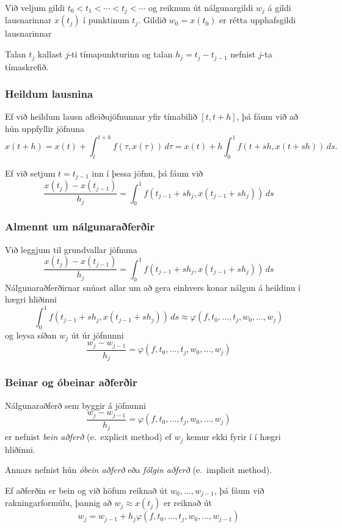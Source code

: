 \documentclass[icelandic,a4paper,12pt]{article}
\begin{document}
\pause
\smallskip
Við veljum gildi $t_0 < t_1 < \cdots < t_j<\cdots$ og reiknum út
nálgunargildi $w_j$ á gildi lausnarinnar $x(t_j)$ í punktinum
$t_j$.   Gildið $w_0=x(t_0)$ er rétta upphafsgildi lausnarinnar 

\smallskip
Talan $t_j$ kallast $j$-ti tímapunkturinn og talan
$h_j=t_j-t_{j-1}$ nefnist $j$-ta tímaskrefið.



\subsubsection{Heildum lausnina}
Ef við heildum lausn afleiðujöfnunnar yfir tímabilið 
$[t,t+h]$, þá fáum við að hún uppfyllir jöfnuna
$$
x(t+h)=x(t)+\int_t^{t+h}f(\tau,x(\tau))\, d\tau
=x(t)+h\int_0^1f(t+sh,x(t+sh))\, ds.
$$

\pause
\smallskip
Ef við setjum $t=t_{j-1}$ inn í þessa jöfnu, þá fáum við
$$
\dfrac{x(t_j)-x(t_{j-1})}{h_j}=\int_0^1f(t_{j-1}+sh_j,x(t_{j-1}+sh_j))\, ds
$$



\subsubsection{Almennt um nálgunaraðferðir} 
Við leggjum til grundvallar jöfnuna
$$
  \dfrac{x(t_j)-x(t_{j-1})}{h_j}=\int_0^1f(t_{j-1}+sh_j,x(t_{j-1}+sh_j))\, ds
$$
Nálgunaraðferðirnar snúast allar um að gera einhvers konar nálgun á
heildinu í hægri hliðinni
$$
  \int_0^1f(t_{j-1}+sh_j,x(t_{j-1}+sh_j))\, ds
  \approx \varphi(f,t_0,\dots,t_j,w_0,\dots,w_j)
$$
og leysa síðan $w_j$ út úr jöfnunni 
$$
  \dfrac{w_j-w_{j-1}}{h_j}=\varphi(f,t_0,\dots,t_j,w_0,\dots,w_j)
$$



\subsubsection{Beinar og óbeinar aðferðir} 
Nálgunaraðferð sem byggir á jöfnunni
$$
  \dfrac{w_j-w_{j-1}}{h_j}=\varphi(f,t_{0},\dots,t_j,w_{0},\dots,w_j)
$$
er nefnist {\it bein aðferð} (e.~explicit method) ef 
$w_j$ kemur ekki fyrir í í hægri hliðinni.  

\smallskip
Annars nefnist hún  {\it óbein aðferð} eða {\it fólgin aðferð} 
(e.~implicit method).

\smallskip
Ef aðferðin er bein og við höfum reiknað út $w_0,\dots,w_{j-1}$,
þá fáum við rakningarformúlu, þannig að 
$w_j\approx x(t_j)$ er reiknað út
$$
  w_j=w_{j-1}+h_j\varphi(f,t_{0},\dots,t_j,w_{0},\dots,w_{j-1})
$$
\end{document}
